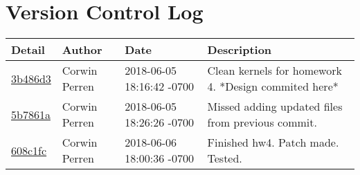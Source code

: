 \section{Version Control Log}
\begin{center}
\begin{tabular}{l l l l}	\textbf{Detail} & \textbf{Author} & \textbf{Date} &\textbf{Description}\\\hline

\href{.//commit/3b486d3c5ba08b193bc64b47e5cab98ac4cbbafe}{3b486d3} & Corwin Perren & 2018-06-05 18:16:42 -0700 &Clean kernels for homework 4. *Design commited here*\\\hline
\href{.//commit/5b7861a5682daf082272f8e0dd24a0174ef70f4b}{5b7861a} & Corwin Perren & 2018-06-05 18:26:26 -0700 &Missed adding updated files from previous commit.\\\hline
\href{.//commit/608c1fc75c1be5e2a87a81185c3a09712ca5232f}{608c1fc} & Corwin Perren & 2018-06-06 18:00:36 -0700 &Finished hw4. Patch made. Tested.\\\hline


\end{tabular}
\end{center}